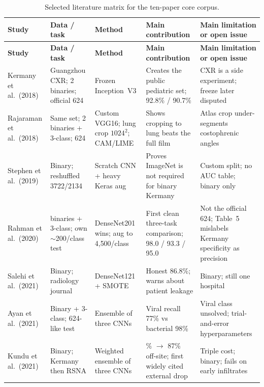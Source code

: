 \documentclass[11pt,a4paper]{article}
\begin{document}
{\small
\setlength{\tabcolsep}{3.5pt}
\begin{longtable}{>{\raggedright\arraybackslash}p{}
                  >{\raggedright\arraybackslash}p{}
                  >{\raggedright\arraybackslash}p{}
                  >{\raggedright\arraybackslash}p{}
                  >{\raggedright\arraybackslash}p{}}
\caption{Selected literature matrix for the ten-paper core corpus.}
\label{tab:matrix}\\
\toprule
\textbf{Study} & \textbf{Data / task} & \textbf{Method} & \textbf{Main contribution} & \textbf{Main limitation or open issue} \\
\midrule
\endfirsthead
\toprule
\textbf{Study} & \textbf{Data / task} & \textbf{Method} & \textbf{Main contribution} & \textbf{Main limitation or open issue} \\
\midrule
\endhead
\bottomrule
\endfoot
Kermany et al.\ (2018) &
Guangzhou CXR; 2 binaries; official 624 &
Frozen Inception~V3 &
Creates the public pediatric set; 92.8\% / 90.7\% &
CXR is a side experiment; freeze later disputed \\
\addlinespace
Rajaraman et al.\ (2018) &
Same set; 2 binaries + 3-class; 624 &
Custom VGG16; lung crop $1024^2$; CAM/LIME &
Shows cropping to lung beats the full film &
Atlas crop under-segments costophrenic angles \\
\addlinespace
Stephen et al.\ (2019) &
Binary; reshuffled 3722/2134 &
Scratch CNN + heavy Keras aug &
Proves ImageNet is not required for binary Kermany &
Custom split; no AUC table; binary only \\
\addlinespace
Rahman et al.\ (2020) &
2 binaries + 3-class; own $\sim$200/class test &
DenseNet201 wins; aug to 4{,}500/class &
First clean three-task comparison; 98.0 / 93.3 / 95.0 &
Not the official 624; Table~5 mislabels Kermany specificity as precision \\
\addlinespace
Salehi et al.\ (2021) &
Binary; radiology journal &
DenseNet121 + SMOTE &
Honest 86.8\%; warns about patient leakage &
Binary; still one hospital \\
\addlinespace
Ayan et al.\ (2021) &
Binary + 3-class; 624-like test &
Ensemble of three CNNs &
Viral recall 77\% vs bacterial 98\% &
Viral class unsolved; trial-and-error hyperparameters \\
\addlinespace
Kundu et al.\ (2021) &
Binary; Kermany then RSNA &
Weighted ensemble of three CNNs &
98.8\% $\rightarrow$ 87\% off-site; first widely cited external drop &
Triple cost; binary; fails on early infiltrates \\

\end{longtable}}
\end{document}
